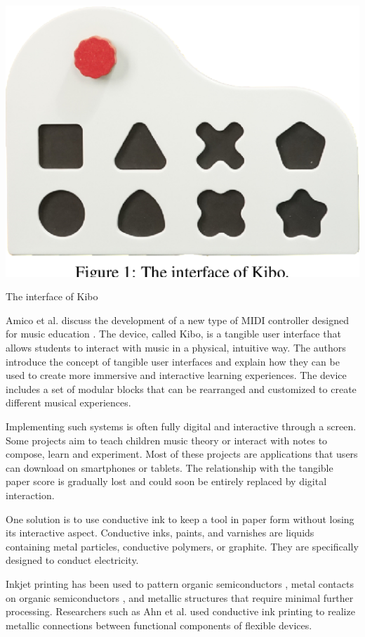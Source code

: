 \begin{marginfigure}
    \centering
    \includegraphics{images/IS_kibo.png}
    \caption{The interface of Kibo}
    \label{fig:amico2020kibo}
\end{marginfigure}

Amico et al. discuss the development of a new type of MIDI controller designed for music education \cite{amico2020kibo}. The device, called Kibo, is a tangible user interface that allows students to interact with music in a physical, intuitive way.
The authors introduce the concept of tangible user interfaces and explain how they can be used to create more immersive and interactive learning experiences.
The device includes a set of modular blocks that can be rearranged and customized to create different musical experiences.

Implementing such systems is often fully digital and interactive through a screen. Some projects aim to teach children music theory or interact with notes to compose, learn and experiment. Most of these projects are applications that users can download on smartphones or tablets. The relationship with the tangible paper score is gradually lost and could soon be entirely replaced by digital interaction.

One solution is to use conductive ink to keep a tool in paper form without losing its interactive aspect. Conductive inks, paints, and varnishes are liquids containing metal particles, conductive polymers, or graphite. They are specifically designed to conduct electricity.

Inkjet printing has been used to pattern organic semiconductors \cite{kim2008heterogeneous}, metal contacts on organic semiconductors \cite{khan2019soft} \cite{wessely2020sprayable}, and metallic structures that require minimal further processing. Researchers such as Ahn et al. used conductive ink printing to realize metallic connections between functional components of flexible devices. 

